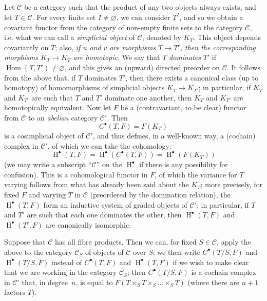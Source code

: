 \documentclass{article}
\renewcommand{\cal}[1]{{\mathcal{#1}}}
\DeclareMathOperator{\Hom}{Hom}
\DeclareMathOperator{\HH}{H}
\newcommand{\oldpage}[1]{\marginpar{\footnotesize$\Big\vert$ \textit{p.~#1}}}
\begin{document}
\subsection{}
\label{A.4.a}

Let $\cal{C}$ be a category such that the product of any two objects always exists, and let $T\in\cal{C}$.
For every finite set $I\neq\varnothing$, we can consider $T^I$, and so we obtain a covariant functor from the category of non-empty finite sets to the category $\cal{C}$, i.e. what we can call a \emph{simplicial object} of $\cal{C}$, denoted by $K_T$.
This object depends covariantly on $T$;
also, \emph{if $u$ and $v$ are morphisms $T\to T'$, then the corresponding morphisms $K_T\to K_{T}$ are homotopic}.
We say that $T$ \emph{dominates} $T'$ if $\Hom(T,T')\neq\varnothing$, and this gives an (upward) directed preorder on $\cal{C}$.
It follows from the above that, if $T$ dominates $T'$, then there exists a canonical class (up to homotopy) of homomorphisms of simplicial objects $K_T\to K_{T'}$;
in particular, if $K_T$ and $K_{T'}$ are such that $T$ and $T'$ dominate one another, then $K_T$ and $K_{T'}$ are homotopically equivalent.
Now let $F$ be a (contravariant, to be clear) functor from $\cal{C}$ to an \emph{abelian} category $\cal{C}'$.
Then
\[
  C^\bullet(T,F) = F(K_T)
\]
is a cosimplicial object of $\cal{C}'$, and thus defines, in a well-known way, a (cochain) complex in $\cal{C}'$, of which we can take the cohomology:
\[
  \HH^\bullet(T,F)
  = \HH^\bullet(C^\bullet(T,F))
  = \HH^\bullet(F(K_T))
\]
(we may write a subscript ``$\cal{C}$'' on the $\HH^\bullet$ if there is any possibility for confusion).
This is a cohomological functor in $F$, of which the variance for $T$ varying follows from what has already been said about the $K_T$;
more precisely, for fixed $F$ and varying $T$ in $\cal{C}$ (preordered by the domination relation), the $\HH^\bullet(T,F)$ form an inductive system of graded objects of $\cal{C}'$;
in particular, if $T$ and $T'$ are such that each one dominates the other, then $\HH^\bullet(T,F)$ and $\HH^\bullet(T',F)$ are canonically isomorphic.

Suppose that $\cal{C}$ has all fibre products.
Then we can, for fixed $S\in\cal{C}$, apply the above to the category $\cal{C}_S$ of objects of $\cal{C}$ over $S$;
we then write $C^\bullet(T/S,F)$ and $\HH^\bullet(T/S,F)$ instead of $C^\bullet(T,F)$ and $\HH^\bullet(T,F)$ if we wish to make clear that we are working in the category $\cal{C}_S$;
then
\oldpage{190-13}
$C^\bullet(T/S,F)$ is a cochain complex in $\cal{C}'$ that, in degree~$n$, is equal to $F(T\times_S T\times_S\ldots\times_S T)$ (where there are $n+1$ factors $T$).
\end{document}
